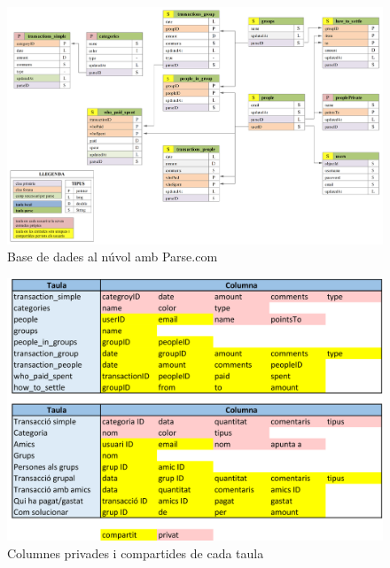 \begin{figure}[ht]
\centering
\includegraphics[scale=0.48]{db_parse.png}
\caption{Base de dades al núvol amb Parse.com}\label{fig:db_parse}
\end{figure}

\begin{figure}[ht]
\centering
\includegraphics[scale=0.8]{db_private_shared.png}
\caption{Columnes privades i compartides de cada taula}\label{fig:db_private_shared}
\end{figure}
